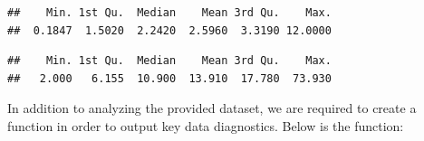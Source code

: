 \documentclass[]{article}
\newenvironment{Shaded}{\begin{snugshade}}{\end{snugshade}}
\newcommand{\KeywordTok}[1]{\textcolor[rgb]{0.13,0.29,0.53}{\textbf{{#1}}}}
\newcommand{\CommentTok}[1]{\textcolor[rgb]{0.56,0.35,0.01}{\textit{{#1}}}}
\newcommand{\NormalTok}[1]{{#1}}
\begin{document}
\begin{Shaded}
\end{Shaded}

\begin{verbatim}
##    Min. 1st Qu.  Median    Mean 3rd Qu.    Max. 
##  0.1847  1.5020  2.2420  2.5960  3.3190 12.0000
\end{verbatim}

\begin{Shaded}
\end{Shaded}

\begin{verbatim}
##    Min. 1st Qu.  Median    Mean 3rd Qu.    Max. 
##   2.000   6.155  10.900  13.910  17.780  73.930
\end{verbatim}

In addition to analyzing the provided dataset, we are required to create
a function in order to output key data diagnostics. Below is the
function:
\end{document}
